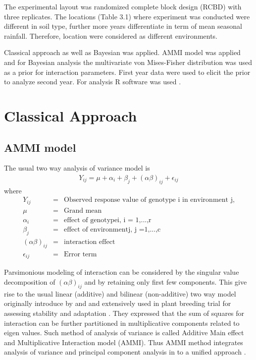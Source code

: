 The experimental layout was randomized complete block design (RCBD) with three replicates. The locations (Table 3.1) where experiment was conducted were different in soil type, further more years differentiate in term of mean seasonal rainfall. Therefore, location were considered as different environments.

 Classical approach as well as Bayesian was applied. AMMI model was applied and for Bayesian analysis the multivariate von Mises-Fisher distribution was used as a prior for interaction parameters. First year data were used to elicit the prior to analyze second year. For analysis R software was used \citep{R2015}.
\section{Classical Approach}
\subsection{AMMI model}
The usual two way analysis of variance model is
\begin{eqnarray}
Y_{ij}=\mu+\alpha_i +\beta_j+(\alpha\beta)_{ij}+\epsilon_{ij} 
\end{eqnarray}
where 
\begin{eqnarray}
Y_{ij}&=& \text{Observed response value of genotype i in environment j},\nonumber\\
\mu &=& \text{Grand mean}  \nonumber \\
\alpha_i &=& \text{effect of genotypei, i = 1,...,r} \nonumber  \\
\beta_j &=& \text{effect of environmentj, j =1,...,c}  \nonumber\\
(\alpha\beta)_{ij} &=& \text{interaction effect} \nonumber \\
\epsilon_{ij}&=& \text{Error term} \nonumber
\end{eqnarray}
	
	Parsimonious modeling of interaction can be considered by the singular value decomposition of $(\alpha\beta)_{ij}$ and by retaining only first few components. This give rise to the usual linear (additive) and bilinear (non-additive) two way model originally introduce by \citet{GOLLOB1968} and \citet{Mandel1971} and extensively used in plant breeding trial for assessing stability and adaptation \citep{Crossa2004}. They expressed that the sum of squares for interaction can be further partitioned in multiplicative components related to eigen values. Such method of analysis of variance is called   Additive Main effect and Multiplicative Interaction model (AMMI). Thus AMMI method integrates analysis of variance and principal component analysis in to a unified approach \citep{Bradu1978, GABRIEL1971, Gauch1988}.

